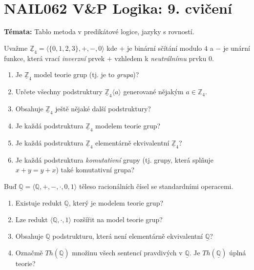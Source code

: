 \documentclass[a4paper,12pt]{article}
\begin{document}
\section*{NAIL062 V\&P Logika: 9. cvičení}

\textbf{Témata:}
Tablo metoda v predikátové logice, jazyky s rovností.




\medskip\begin{problem}
    Uvažme $\underline{\mathbb{Z}}_4=\langle\{0,1,2,3\},+,-,0 \rangle$ kde $+$ je binární sčítání modulo $4$ a $-$ je unární funkce, která vrací \emph{inverzní} prvek $+$ vzhledem k \emph{neutrálnímu} prvku $0$.
    \begin{enumerate}        
        \item Je $\underline{\mathbb{Z}}_4$ model teorie grup (tj. je to \emph{grupa})?
        \item Určete všechny podstruktury $\underline{\mathbb{Z}}_4\langle a\rangle$ generované nějakým $a\in \mathbb{Z}_4$.
        \item Obsahuje $\underline{\mathbb{Z}}_4$ ještě nějaké další podstruktury?
        \item Je každá podstruktura $\underline{\mathbb{Z}}_4$ modelem teorie grup?
        \item Je každá podstruktura $\underline{\mathbb{Z}}_4$ elementárně ekvivalentní $\underline{\mathbb{Z}}_4$?
        \item Je každá podstruktura \emph{komutativní} grupy (tj. grupy, která splňuje $x+y=y+x$) také komutativní grupa?
    \end{enumerate}
\end{problem}
 
        
\medskip\begin{problem}
    Buď $\underline{\mathbb{Q}}=\langle\mathbb{Q},+,-,\cdot,0,1 \rangle$ těleso racionálních čísel se standardními operacemi.
    \begin{enumerate}                
        \item Existuje redukt $\underline{\mathbb{Q}}$, který je modelem teorie grup?
        \item Lze redukt $\langle\mathbb{Q},\cdot,1\rangle$ rozšířit na model teorie grup?
        \item Obsahuje $\underline{\mathbb{Q}}$ podstrukturu, která není elementárně ekvivalentní $\underline{\mathbb{Q}}$?
        \item Označmě $Th(\underline{\mathbb{Q}})$ množinu všech sentencí pravdivých v $\underline{\mathbb{Q}}$. Je $Th(\underline{\mathbb{Q}})$ úplná teorie?
    \end{enumerate}
\end{problem}
    
\end{document}

